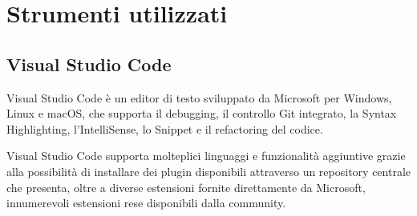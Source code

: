\section{Strumenti utilizzati}
\subsection{Visual Studio Code}
Visual Studio Code è un editor di testo sviluppato da Microsoft per Windows, Linux e macOS, che supporta il debugging, il controllo Git integrato, la Syntax Highlighting, l'IntelliSense, lo Snippet e il refactoring del codice. 

Visual Studio Code supporta molteplici linguaggi e funzionalità aggiuntive grazie alla possibilità di installare dei plugin disponibili attraverso un repository centrale che presenta, oltre a diverse estensioni fornite direttamente da Microsoft, innumerevoli estensioni rese disponibili dalla community. 

